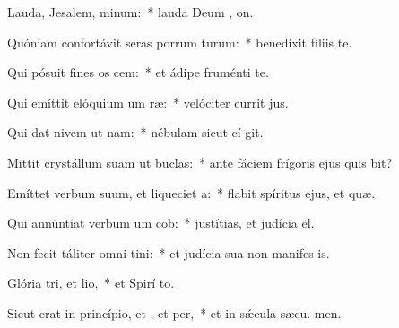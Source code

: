 \item Lauda, Jesalem, minum:~* lauda Deum , on.
\item Quóniam confortávit seras porrum turum:~* benedíxit fíliis   te.
\item Qui pósuit fines os cem:~* et ádipe fruménti  te.
\item Qui emíttit elóquium um ræ:~* velóciter currit  jus.
\item Qui dat nivem ut nam:~* nébulam sicut cí git.
\item Mittit crystállum suam ut buclas:~* ante fáciem frígoris ejus quis bit?
\item Emíttet verbum suum, et liqueciet a:~* flabit spíritus ejus, et  quæ.
\item Qui annúntiat verbum um cob:~* justítias, et judícia  ël.
\item Non fecit táliter omni tini:~* et judícia sua non manifes is.
\item Glória tri, et lio,~* et Spirí to.
\item Sicut erat in princípio, et , et per,~* et in sǽcula sæcu. men.
